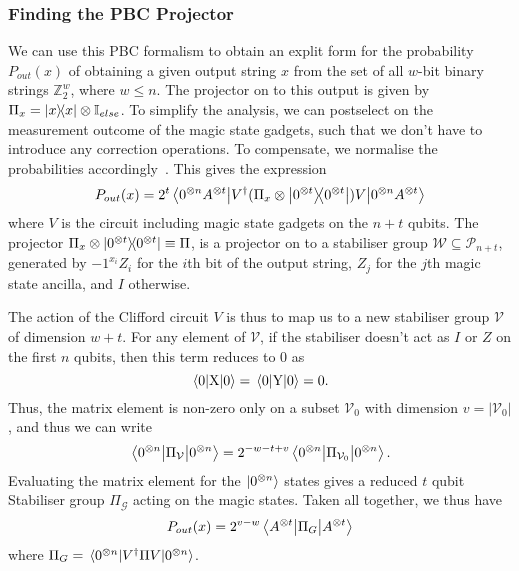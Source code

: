 \documentclass{standalone}
\begin{document}
\subsubsection*{Finding the PBC Projector}\label{sec:pbcproj}
We can use this PBC formalism to obtain an explit form for the probability $P_{out}(x)$ of obtaining a given output string $x$ from the set of all $w$-bit binary strings $\mathbb{Z}_{2}^{w}$, where $w\leq n$. The projector on to this output is given by $\Pi_{x} = \ketbra{x}{x}\otimes\mathbb{I}_{else}$. To simplify the analysis, we can postselect on the measurement outcome of the magic state gadgets, such that we don't have to introduce any correction operations. To compensate, we normalise the probabilities accordingly~\cite{Bravyi2015}. This gives the expression
\begin{equation}
P_{out}(x) = 2^{t}\matrixel{0^{\otimes n}A^{\otimes t}}{V^{\dagger}(\Pi_{x}\otimes\ketbra{0^{\otimes t}}{0^{\otimes t}})V}{0^{\otimes n}A^{\otimes t}}
\end{equation}
where $V$ is the circuit including magic state gadgets on the $n+t$ qubits. The projector $\Pi_{x}\otimes\ketbra{0^{\otimes t}}{0^{\otimes t}}\equiv\Pi$, is a projector on to a stabiliser group $\mathcal{W}\subseteq\mathcal{P}_{n+t}$, generated by $-1^{x_{i}}Z_{i}$ for the $i$th bit of the output string, $Z_{j}$ for the $j$th magic state ancilla, and $I$ otherwise.
\par
The action of the Clifford circuit $V$ is thus to map us to a new stabiliser group $\mathcal{V}$ of dimension $w+t$. For any element of $\mathcal{V}$, if the stabiliser doesn't act as $I$ or $Z$ on the first $n$ qubits, then this term reduces to $0$ as 
\[\matrixel{0}{\text{X}}{0}=\matrixel{0}{\text{Y}}{0}=0.\]
Thus, the matrix element is non-zero only on a subset $\mathcal{V}_{0}$ with dimension $v=\vert\mathcal{V}_{0}\vert$, and thus we can write
\begin{equation}
    \matrixel{0^{\otimes n}}{\Pi_{\mathcal{V}}}{0^{\otimes n}} = 2^{-w-t+v}\matrixel{0^{\otimes n}}{\Pi_{\mathcal{V}_{0}}}{0^{\otimes n}}.
\end{equation}
Evaluating the matrix element for the $\ket{0^{\otimes n}}$ states gives a reduced $t$ qubit Stabiliser group $\Pi_{\mathcal{G}}$ acting on the magic states. Taken all together, we thus have 
\begin{equation}
    P_{out}(x) = 2^{v-w}\matrixel{A^{\otimes t}}{\Pi_{G}}{A^{\otimes t}}
\end{equation}
where $\Pi_{G}=\matrixel{0^{\otimes n}}{V^{\dagger}\Pi V}{0^{\otimes n}}$. 
\end{document}
